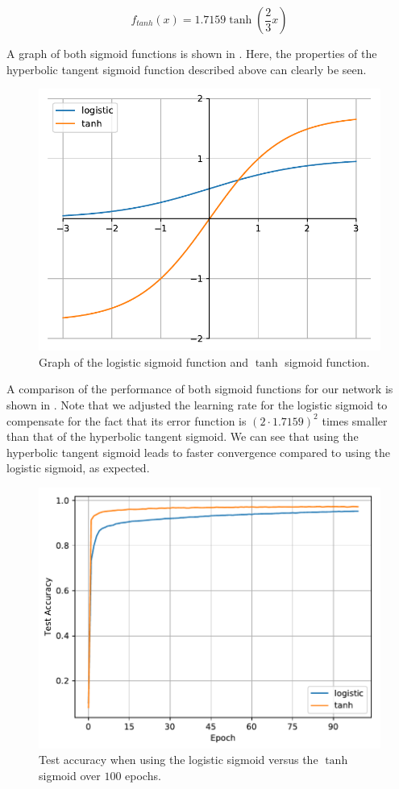 \documentclass[journal,hidelinks]{IEEEtran}
\begin{document}
\begin{equation} \label{eq:sigmoid_tanh}
f_{tanh}(x) = 1.7159 \tanh \left( \frac{2}{3} x \right)
\end{equation}

A graph of both sigmoid functions is shown in . Here, the properties of the hyperbolic tangent sigmoid function described above can clearly be seen.

\begin{figure}[!htb]
  \centering
  \includegraphics[width=0.8\columnwidth]{plots/logistic_vs_tanh_function.pdf}
  \caption{Graph of the logistic sigmoid function and $\tanh$ sigmoid function.}
  \label{fig:logistic_vs_tanh_function}
\end{figure}

A comparison of the performance of both sigmoid functions for our network is shown in . Note that we adjusted the learning rate for the logistic sigmoid to compensate for the fact that its error function is $(2 \cdot 1.7159)^2$ times smaller than that of the hyperbolic tangent sigmoid.
We can see that using the hyperbolic tangent sigmoid leads to faster convergence compared to using the logistic sigmoid, as expected.

\begin{figure}[!htb]
  \centering
  \includegraphics[width=0.8\columnwidth]{plots/logistic_vs_tanh.pdf}
  \caption{Test accuracy when using the logistic sigmoid versus the $\tanh$ sigmoid over $100$ epochs.}
  \label{fig:logistic_vs_tanh}
\end{figure}
\end{document}
